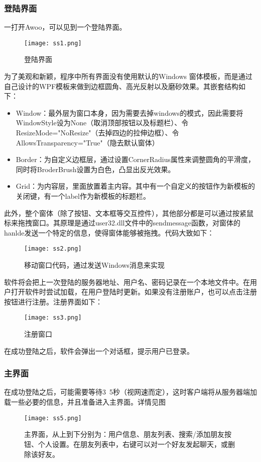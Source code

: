 \documentclass[a4paper,11pt]{article}
\begin{document}
        \subsubsection{登陆界面}
            一打开Awoo，可以见到一个登陆界面。\par
            \begin{figure}[H]
                \centering
                \texttt{[image: ss1.png]}
                \caption{登陆界面}
            \end{figure}
            为了美观和新颖，程序中所有界面没有使用默认的Windows 窗体模板，而是通过自己设计的WPF模板来做到边框圆角、高光反射以及磨砂效果。其嵌套结构如下：\par
            \begin{itemize}
                \item Window：最外层为窗口本身，因为需要去掉windows的模式，因此需要将WindowStyle设为None（取消顶部按钮以及标题栏）、令ResizeMode="NoResize"（去掉四边的拉伸边框）、令
                    AllowsTransparency="True"（隐去默认窗体）
                \item Border：为自定义边框层，通过设置CornerRadius属性来调整圆角的平滑度，同时将BroderBrush设置为白色，凸显出反光效果。
                \item Grid：为内容层，里面放置着主内容。其中有一个自定义的按钮作为新模板的关闭键，有一个label作为新模板的标题栏。
            \end{itemize}
            此外，整个窗体（除了按钮、文本框等交互控件），其他部分都是可以通过按紧鼠标来拖拽窗口。其原理是通过user32.dll文件中的sendmessage函数，对窗体的hanlde发送一个特定的信息，使得窗体能够被拖拽。代码大致如下：\par
            \begin{figure}[H]
                \centering
                \texttt{[image: ss2.png]}
                \caption{移动窗口代码，通过发送Windows消息来实现}
            \end{figure}
            软件将会把上一次登陆的服务器地址、用户名、密码记录在一个本地文件中。在用户打开软件时尝试加载，在用户登陆时更新。如果没有注册账户，也可以点击注册按钮进行注册。注册界面如下：\par
            \begin{figure}[H]
                \centering
                \texttt{[image: ss3.png]}
                \caption{注册窗口}
            \end{figure}
            在成功登陆之后，软件会弹出一个对话框，提示用户已登录。
        \subsubsection{主界面}
            在成功登陆之后，可能需要等待3~5秒（视网速而定），这时客户端将从服务器端加载一些必要的信息，并且准备进入主界面。详情见图\par
            \begin{figure}[H]
                \centering
                \texttt{[image: ss5.png]}
                \caption{主界面，从上到下分别为：用户信息、朋友列表、搜索/添加朋友按钮、个人设置。在朋友列表中，右键可以对一个好友发起聊天，或删除该好友。}
            \end{figure}
\end{document}

